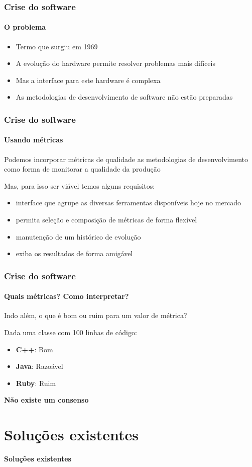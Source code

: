 \documentclass{beamer}
\begin{document}
\begin{frame}
  \frametitle{Crise do software}
  \framesubtitle{O problema}

  \begin{itemize}
    \item Termo que surgiu em 1969
    \item A evolução do hardware permite resolver problemas mais difíceis
    \item Mas a interface para este hardware é complexa
    \item As metodologias de desenvolvimento de software não estão preparadas
  \end{itemize}
\end{frame}

\begin{frame}
  \frametitle{Crise do software}
  \framesubtitle{Usando métricas}

  Podemos incorporar métricas de qualidade as metodologias de desenvolvimento como forma de monitorar a qualidade da produção

  Mas, para isso ser viável temos alguns requisitos:
  \begin{itemize}
    \item interface que agrupe as diversas ferramentas disponíveis hoje no mercado
    \item permita seleção e composição de métricas de forma flexível
    \item manutenção de um histórico de evolução
    \item exiba os resultados de forma amigável
  \end{itemize}
\end{frame}

\begin{frame}
  \frametitle{Crise do software}
  \framesubtitle{Quais métricas? Como interpretar?}

  Indo além, o que é bom ou ruim para um valor de métrica?

  Dada uma classe com 100 linhas de código:
  \begin{itemize}
    \item \textbf{C++}: Bom
    \item \textbf{Java}: Razoável
    \item \textbf{Ruby}: Ruim
  \end{itemize}

  \textbf{Não existe um consenso}
\end{frame}

\section{Soluções existentes}
\begin{frame}
  \LARGE{\textbf{Soluções existentes}}
\end{frame}
\end{document}
